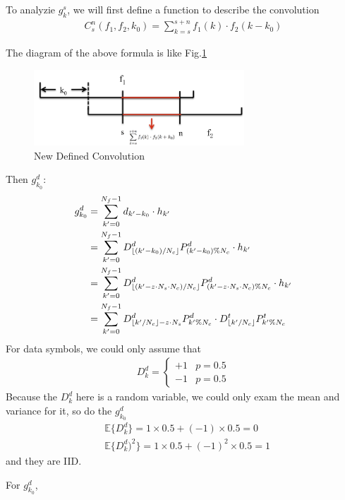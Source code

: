 \documentclass[a4paper]{report}
\DeclarePairedDelimiter\floor{\lfloor}{\rfloor}
\begin{document}
To analyzie $g^s_k$, we will first define a function to describe the convolution
\begin{align}
	C^n_s(f_1, f_2, k_0) = \sum_{k = s}^{s+n} f_1(k)\cdot f_2(k - k_0) \label{eq:New Defined Convolution}
\end{align}

The diagram of the above formula is like Fig.\ref{fig:New Defined Convolution}
\begin{figure}[ht]
	\centering
	\includegraphics[width=3.1in]{figure/conv_figure.png}
	\caption{New Defined Convolution}
	\label{fig:New Defined Convolution}
\end{figure}
Then $g^d_{k_0}$: \label{eq:perfectly aligned-data}
\begin{align}
	g^d_{k_0}
	&= \sum_{k' = 0}^{N_f-1} d_{k' - k_0} \cdot h_{k'} \\
	&= \sum_{k' = 0}^{N_f-1} D^d_{\floor{(k' - k_0)/N_c}}P^d_{(k' - k_0)\%N_c} \cdot h_{k'}\\
	&= \sum_{k' = 0}^{N_f-1} D^d_{\floor{(k' - z \cdot N_s \cdot N_c)/N_c}} P^d_{(k' - z \cdot N_s \cdot N_c)\%N_c}\cdot h_{k'}\\
	&= \sum_{k' = 0}^{N_f-1} D^d_{\floor{k'/N_c} - z \cdot N_s} P^d_{k'\%N_c} \cdot D^t_{\floor{k'/N_c}} P^t_{k' \% N_c} 
\end{align}
For data symbols, we could only assume that 
\begin{align}
	D^d_k = 
	\begin{cases}
	+1 & p = 0.5\\
	-1 & p = 0.5	
	\end{cases}
\end{align}
Because the $D^d_k$ here is a random variable, we could only exam the mean and variance for it, so do the $g^d_{k_0}$
\begin{align}
	&\mathbb{E} \{D^d_k\} = 1 \times 0.5 + (-1) \times 0.5 = 0\\
	&\mathbb{E} \{D^d_k)^2\} = 1 \times 0.5 + (-1)^2 \times 0.5 = 1
\end{align}
and they are IID.

For $g^d_{k_0}$,
\end{document}
